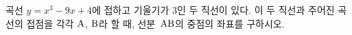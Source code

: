 곡선 $y=x^3-9x+4$에 접하고 기울기가 $3$인 두 직선이 있다. 이 두 직선과 주어진 곡선의 접점을 각각 $\mathrm{A}$, $\mathrm{B}$라 할 때, 선분~$\mathrm{AB}$의 중점의 좌표를 구하시오.
